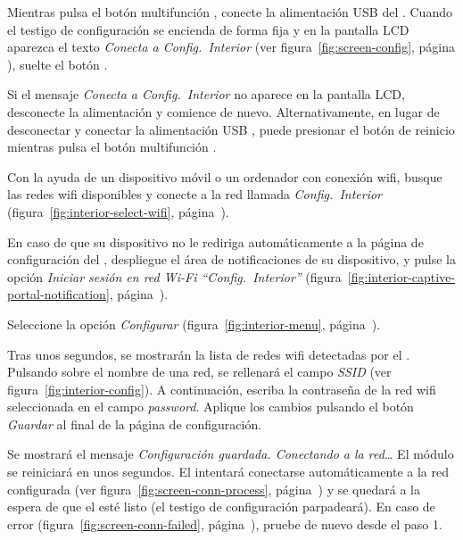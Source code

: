 \begin{enumeratecompact}

\item Mientras pulsa el botón multifunción , conecte la alimentación USB  del \MI. Cuando el testigo de configuración  se encienda de forma fija y en la pantalla LCD  aparezca el texto \emph{Conecta a Config.~Interior} (ver figura~\ref{fig:screen-config}, página \pageref{fig:screen-config}), suelte el botón .

Si el mensaje \emph{Conecta a Config.~Interior} no aparece en la pantalla LCD, desconecte la alimentación y comience de nuevo. Alternativamente, en lugar de desconectar y conectar la alimentación USB , puede presionar el botón de reinicio  mientras pulsa el botón multifunción .

\item Con la ayuda de un dispositivo móvil o un ordenador con conexión wifi, busque las redes wifi disponibles y conecte a la red llamada \emph{Config.~Interior} (figura~\ref{fig:interior-select-wifi}, página~\pageref{fig:interior-select-wifi}).

\item En caso de que su dispositivo no le rediriga automáticamente a la página de configuración del \MI, despliegue el área de notificaciones de su dispositivo, y pulse la opción \emph{Iniciar sesión en red Wi-Fi ``Config.~Interior''} (figura~\ref{fig:interior-captive-portal-notification}, pá\-gi\-na~\pageref{fig:interior-captive-portal-notification}).

\item Seleccione la opción \emph{Configurar} (figura~\ref{fig:interior-menu}, página~\pageref{fig:interior-menu}).

\item Tras unos segundos, se mostrarán la lista de redes wifi detectadas por el \MI. Pulsando sobre el nombre de una red, se rellenará el campo \emph{SSID} (ver figura~\ref{fig:interior-config}). A continuación, escriba la contraseña de la red wifi seleccionada en el campo \emph{password}. Aplique los cambios pulsando el botón \emph{Guardar} al final de la página de configuración.

\item Se mostrará el mensaje \emph{Configuración guardada. Conectando a la red\ldots} El módulo se reiniciará en unos segundos. El \MI intentará conectarse automáticamente a la red configurada (ver figura~\ref{fig:screen-conn-process}, página~\pageref{fig:screen-conn-process}) y se quedará a la espera de que el \ME esté listo (el testigo de configuración  parpadeará). En caso de error (figura~\ref{fig:screen-conn-failed}, página~\pageref{fig:screen-conn-failed}), pruebe de nuevo desde el paso 1.

\end{enumeratecompact}


